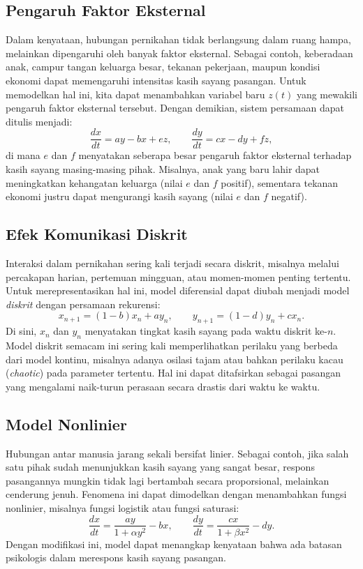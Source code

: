 \documentclass{bukumjh}
\begin{document}
\subsection*{Pengaruh Faktor Eksternal}
Dalam kenyataan, hubungan pernikahan tidak berlangsung dalam ruang hampa, melainkan dipengaruhi oleh banyak faktor eksternal. 
Sebagai contoh, keberadaan anak, campur tangan keluarga besar, tekanan pekerjaan, maupun kondisi ekonomi dapat memengaruhi intensitas kasih sayang pasangan. 
Untuk memodelkan hal ini, kita dapat menambahkan variabel baru $z(t)$ yang mewakili pengaruh faktor eksternal tersebut. 
Dengan demikian, sistem persamaan dapat ditulis menjadi:
\[
\frac{dx}{dt} = a y - b x + e z, \qquad
\frac{dy}{dt} = c x - d y + f z,
\]
di mana $e$ dan $f$ menyatakan seberapa besar pengaruh faktor eksternal terhadap kasih sayang masing-masing pihak. 
Misalnya, anak yang baru lahir dapat meningkatkan kehangatan keluarga (nilai $e$ dan $f$ positif), sementara tekanan ekonomi justru dapat mengurangi kasih sayang (nilai $e$ dan $f$ negatif).

\subsection*{Efek Komunikasi Diskrit}
Interaksi dalam pernikahan sering kali terjadi secara diskrit, misalnya melalui percakapan harian, pertemuan mingguan, atau momen-momen penting tertentu. 
Untuk merepresentasikan hal ini, model diferensial dapat diubah menjadi model \emph{diskrit} dengan persamaan rekurensi:
\[
x_{n+1} = (1-b)x_n + a y_n, \qquad
y_{n+1} = (1-d)y_n + c x_n.
\]
Di sini, $x_n$ dan $y_n$ menyatakan tingkat kasih sayang pada waktu diskrit ke-$n$. 
Model diskrit semacam ini sering kali memperlihatkan perilaku yang berbeda dari model kontinu, misalnya adanya osilasi tajam atau bahkan perilaku kacau (\emph{chaotic}) pada parameter tertentu. 
Hal ini dapat ditafsirkan sebagai pasangan yang mengalami naik-turun perasaan secara drastis dari waktu ke waktu.

\subsection*{Model Nonlinier}
Hubungan antar manusia jarang sekali bersifat linier. 
Sebagai contoh, jika salah satu pihak sudah menunjukkan kasih sayang yang sangat besar, respons pasangannya mungkin tidak lagi bertambah secara proporsional, melainkan cenderung jenuh. 
Fenomena ini dapat dimodelkan dengan menambahkan fungsi nonlinier, misalnya fungsi logistik atau fungsi saturasi:
\[
\frac{dx}{dt} = \frac{a y}{1 + \alpha y^2} - b x, \qquad
\frac{dy}{dt} = \frac{c x}{1 + \beta x^2} - d y.
\]
Dengan modifikasi ini, model dapat menangkap kenyataan bahwa ada batasan psikologis dalam merespons kasih sayang pasangan.
\end{document}
